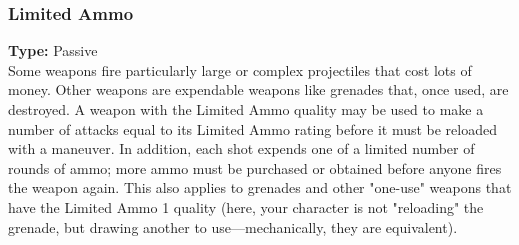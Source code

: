 \subsubsection{Limited Ammo}
\label{iqty:limitedammo}
\textbf{Type:} Passive\\
Some weapons fire particularly large or complex
projectiles that cost lots of money. Other weapons are
expendable weapons like grenades that, once used, are
destroyed. A weapon with the Limited Ammo quality
may be used to make a number of attacks equal to its
Limited Ammo rating before it must be reloaded with a
maneuver. In addition, each shot expends one of a
limited number of rounds of ammo; more ammo must be
purchased or obtained before anyone fires the weapon
again. This also applies to grenades and other "one-use"
weapons that have the Limited Ammo 1 quality (here,
your character is not "reloading" the grenade, but
drawing another to use—mechanically, they are equivalent).
